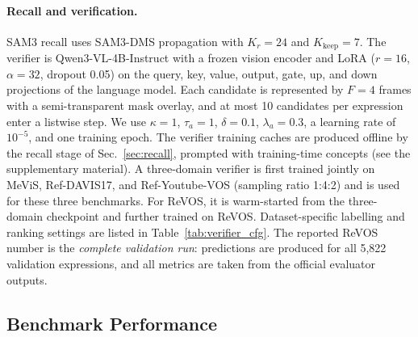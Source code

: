 \paragraph{Recall and verification.}
SAM3 recall uses SAM3-DMS propagation with $K_r=24$ and $K_{\mathrm{keep}}=7$. The verifier is Qwen3-VL-4B-Instruct with a frozen vision encoder and LoRA ($r=16$, $\alpha=32$, dropout 0.05) on the query, key, value, output, gate, up, and down projections of the language model. Each candidate is represented by $F=4$ frames with a semi-transparent mask overlay, and at most 10 candidates per expression enter a listwise step. We use $\kappa=1$, $\tau_a=1$, $\delta=0.1$, $\lambda_a=0.3$, a learning rate of $10^{-5}$, and one training epoch. The verifier training caches are produced offline by the recall stage of Sec.~\ref{sec:recall}, prompted with training-time concepts (see the supplementary material). A three-domain verifier is first trained jointly on MeViS, Ref-DAVIS17, and Ref-Youtube-VOS (sampling ratio 1:4:2) and is used for these three benchmarks. For ReVOS, it is warm-started from the three-domain checkpoint and further trained on ReVOS. Dataset-specific labelling and ranking settings are listed in Table~\ref{tab:verifier_cfg}. The reported ReVOS number is the \emph{complete validation run}: predictions are produced for all 5,822 validation expressions, and all metrics are taken from the official evaluator outputs.

\begin{table}[t]
\centering
\setlength{\tabcolsep}{4.2pt}
\renewcommand{\arraystretch}{1.08}
\caption{Verifier labelling and ranking settings per training set.}
\label{tab:verifier_cfg}
\end{table}

\subsection{Benchmark Performance}
